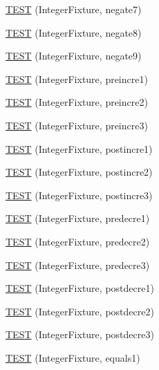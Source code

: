 \begin{DoxyCompactItemize}
\item 
\hyperlink{_old_test_integer_8c_09_09_a7d3356c408dd32d46bc3400907aa2c45}{T\-E\-S\-T} (Integer\-Fixture, negate7)
\item 
\hyperlink{_old_test_integer_8c_09_09_ae65e6b7bb37558da7aeedb312f8c90e6}{T\-E\-S\-T} (Integer\-Fixture, negate8)
\item 
\hyperlink{_old_test_integer_8c_09_09_a6606563c740df8229b8988a0e3346367}{T\-E\-S\-T} (Integer\-Fixture, negate9)
\item 
\hyperlink{_old_test_integer_8c_09_09_a1f411d2ecb4bbe7bd8e3268414fa3dc4}{T\-E\-S\-T} (Integer\-Fixture, preincre1)
\item 
\hyperlink{_old_test_integer_8c_09_09_adfc83751099bbc9145926ba054a8c453}{T\-E\-S\-T} (Integer\-Fixture, preincre2)
\item 
\hyperlink{_old_test_integer_8c_09_09_a607e96817960ad36ec733c7b434545cb}{T\-E\-S\-T} (Integer\-Fixture, preincre3)
\item 
\hyperlink{_old_test_integer_8c_09_09_a0bce5ae03cef7d2b19d25c00f9b560bc}{T\-E\-S\-T} (Integer\-Fixture, postincre1)
\item 
\hyperlink{_old_test_integer_8c_09_09_afa91fad76d9e16f540f9020f94b3d0ff}{T\-E\-S\-T} (Integer\-Fixture, postincre2)
\item 
\hyperlink{_old_test_integer_8c_09_09_aebfdb0ec2a3c8ef3a9b51d566a0977fe}{T\-E\-S\-T} (Integer\-Fixture, postincre3)
\item 
\hyperlink{_old_test_integer_8c_09_09_a52f8ef4525309c8c25d5e8f15ca248fa}{T\-E\-S\-T} (Integer\-Fixture, predecre1)
\item 
\hyperlink{_old_test_integer_8c_09_09_a93618a456d9df7d3cc8d5fd437ff0ebe}{T\-E\-S\-T} (Integer\-Fixture, predecre2)
\item 
\hyperlink{_old_test_integer_8c_09_09_a8f38c4c615ca619567542d2c37e25c8d}{T\-E\-S\-T} (Integer\-Fixture, predecre3)
\item 
\hyperlink{_old_test_integer_8c_09_09_adf469567531cb9fa3a037598936bf0e3}{T\-E\-S\-T} (Integer\-Fixture, postdecre1)
\item 
\hyperlink{_old_test_integer_8c_09_09_a489040d9f34489502fc159950ee4c22b}{T\-E\-S\-T} (Integer\-Fixture, postdecre2)
\item 
\hyperlink{_old_test_integer_8c_09_09_a5e5bd8e1a2178f726f13b3eb481d1070}{T\-E\-S\-T} (Integer\-Fixture, postdecre3)
\item 
\hyperlink{_old_test_integer_8c_09_09_af49f1526a846a2abaecb1266a2aa53d5}{T\-E\-S\-T} (Integer\-Fixture, equals1)
\item 

\end{DoxyCompactItemize}
